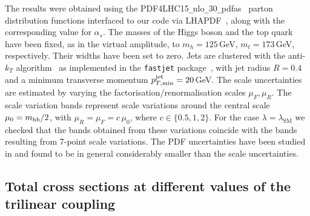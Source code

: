 
The results were obtained using the
PDF4LHC15{\tt\_}nlo{\tt\_}30{\tt\_}pdfas~\cite{Butterworth:2015oua,CT14,MMHT14,NNPDF}
parton distribution functions interfaced to our code via
LHAPDF~\cite{Buckley:2014ana}, along with the corresponding value for
$\alpha_s$.  The masses of the Higgs boson and the top quark have been
fixed, as in the virtual amplitude, to $m_h=125$\,GeV, $m_t=173$\,GeV,
respectively. Their widths have been set to zero.   
Jets are clustered with the
anti-$k_T$ algorithm~\cite{Cacciari:2008gp} as implemented in the
{\tt fastjet} package~\cite{Cacciari:2005hq, Cacciari:2011ma}, with jet
radius $R=0.4$ and a minimum transverse momentum 
$p_{T,\mathrm{min}}^{\rm{jet}}=20$\,GeV.  The scale uncertainties are
estimated by varying the factorisation/renormalisation scales
$\mu_{F}, \mu_{R}$. The scale variation bands 
represent scale variations around the central scale $\mu_0 =m_{\mathrm{hh}}/2$, with
$\mu_{R} = \mu_{F}=c\,\mu_0$, where $c \in \{0.5,1,2\}$.
For the case $\lambda=\lambda_{\mathrm{SM}}$ we checked that the bands
obtained from these variations coincide with the bands resulting from
7-point scale variations. The PDF uncertainties have been studied in
\cite{deFlorian:2016spz} and found to be in general considerably smaller than the scale uncertainties.

\subsection{Total cross sections at different values of the trilinear coupling}

